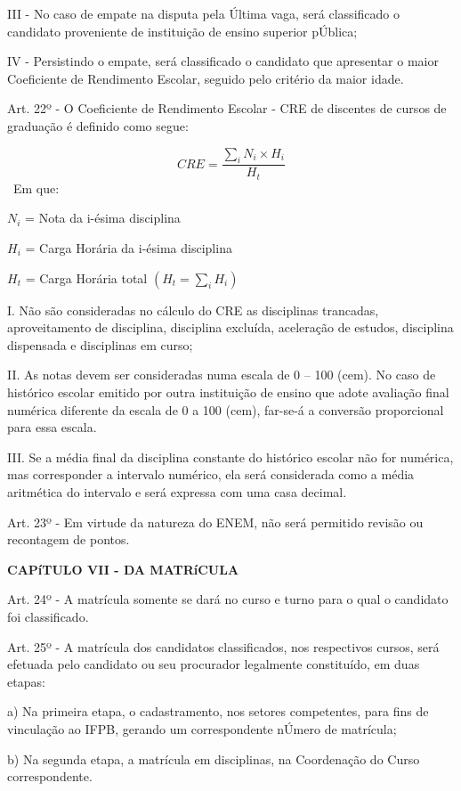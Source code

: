 III - No caso de empate na disputa pela Última vaga, será classificado o candidato proveniente de instituição de ensino superior pÚblica;

IV - Persistindo o empate, será classificado o candidato que apresentar o maior Coeficiente de Rendimento Escolar, seguido pelo critério da maior idade.

Art. 22º - O Coeficiente de Rendimento Escolar - CRE de discentes de cursos de graduação é definido como segue:

$$
CRE = \frac{\sum_{i} N_i \times H_i}{H_t}
$$
~Em que:

$N_i$ = Nota da i-\'esima disciplina

$H_i$ = Carga Horária da i-\'esima disciplina

$H_t$ = Carga Hor\'aria total $(H_t = \sum_{i} H_i)$

I. Não são consideradas no cálculo do CRE as disciplinas trancadas, aproveitamento de disciplina, disciplina excluída, aceleração de estudos, disciplina dispensada e disciplinas em curso;

II. As notas devem ser consideradas numa escala de 0 – 100 (cem). No caso de histórico escolar emitido por outra instituição de ensino que adote avaliação final numérica diferente da escala de 0 a 100 (cem), far-se-á a conversão proporcional para essa escala.

III. Se a média final da disciplina constante do histórico escolar não for numérica, mas corresponder a intervalo numérico, ela será considerada como a média aritmética do intervalo e será expressa com uma casa decimal.

Art. 23º - Em virtude da natureza do ENEM, não será permitido revisão ou recontagem de pontos.

\vspace{4mm}
\textbf{CAPíTULO VII - DA MATRíCULA}
\vspace{4mm}


Art. 24º - A matrícula somente se dará no curso e turno para o qual o candidato foi classificado.

Art. 25º - A matrícula dos candidatos classificados, nos respectivos cursos, será efetuada pelo candidato ou seu procurador legalmente constituído, em duas etapas:

a) Na primeira etapa, o cadastramento, nos setores competentes, para fins de vinculação ao IFPB, gerando um correspondente nÚmero de matrícula;

b) Na segunda etapa, a matrícula em disciplinas, na Coordenação do Curso correspondente.


